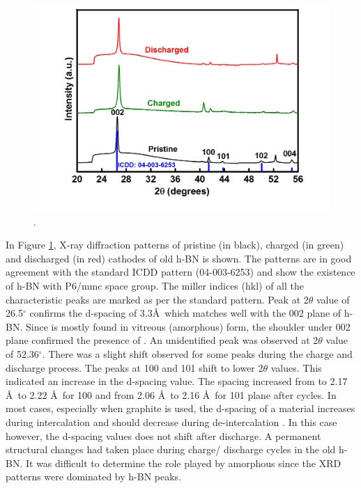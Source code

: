 \begin{figure}[tbh!]
\centering
\includegraphics[width=\textwidth]{Figures/BOhBN/hBNXRD2}
\caption{.}
\label{Figures/BOhBN:hBNXRD2}
\end{figure}

In Figure \ref{Figures/BOhBN:hBNXRD2}, X-ray diffraction patterns of pristine (in black), charged (in green) and discharged (in red) cathodes of old h-BN is shown. The patterns are in good agreement with the standard ICDD pattern (04-003-6253) and show the existence of h-BN with P6/mmc space group. The miller indices (hkl) of all the characteristic peaks are marked as per the standard pattern. Peak at 2$\theta$ value of 26.5$^{\circ}$ confirms the d-spacing of 3.3\AA\, which matches well with the 002 plane of h-BN. Since  is mostly found in vitreous (amorphous) form, the shoulder under 002 plane confirmed the presence of . An unidentified peak was observed at 2$\theta$ value of 52.36$^{\circ}$. There was a slight shift observed for some peaks during the charge and discharge process. The peaks at 100 and 101 shift to lower 2$\theta$ values. This indicated an increase in the d-spacing value. The spacing increased from to 2.17 \AA\ to 2.22 \AA\ for 100 and from 2.06 \AA\ to 2.16 \AA\ for 101 plane after cycles. In most cases, especially when graphite is used, the d-spacing of a material increases during intercalation and should decrease during de-intercalation \cite{wang_advanced_2017, rani_fluorinated_2013}. In this case however, the d-spacing values does not shift after discharge. A permanent structural changes had taken place during charge/ discharge cycles in the old h-BN. It was difficult to determine the role played by amorphous  since the XRD patterns were dominated by h-BN peaks.
 
